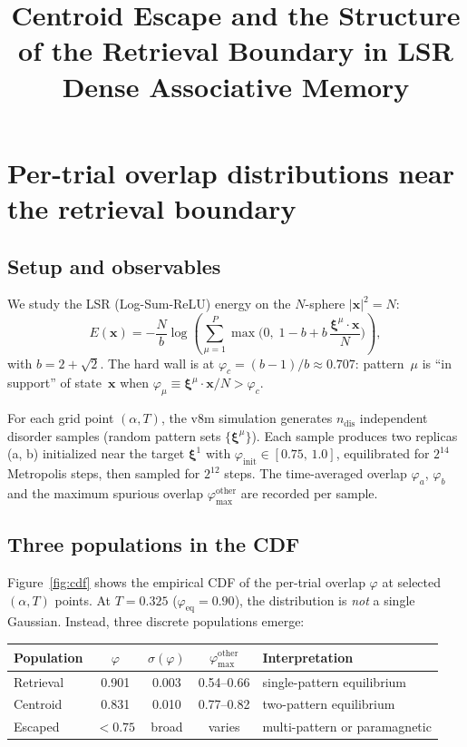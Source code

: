 \documentclass[11pt]{article}
\title{Centroid Escape and the Structure of the Retrieval Boundary in LSR Dense Associative Memory}
\author{}
\date{}
\newcommand{\bxi}{\boldsymbol{\xi}}
\newcommand{\bx}{\mathbf{x}}
\begin{document}
\maketitle

\section{Per-trial overlap distributions near the retrieval boundary}

\subsection{Setup and observables}

We study the LSR (Log-Sum-ReLU) energy on the $N$-sphere $|\bx|^2 = N$:
\begin{equation}
E(\bx) = -\frac{N}{b}\log\left(\sum_{\mu=1}^{P}\max\!\Big(0,\;1 - b + b\,\frac{\bxi^\mu \cdot \bx}{N}\Big)\right),
\label{eq:lsr}
\end{equation}
with $b = 2+\sqrt{2}$.  The hard wall is at $\varphi_c = (b-1)/b \approx 0.707$: pattern~$\mu$ is ``in support'' of state~$\bx$ when $\varphi_\mu \equiv \bxi^\mu\!\cdot\!\bx/N > \varphi_c$.

For each grid point $(\alpha, T)$, the v8m simulation generates $n_{\mathrm{dis}}$ independent disorder samples (random pattern sets $\{\bxi^\mu\}$).  Each sample produces two replicas (a, b) initialized near the target $\bxi^1$ with $\varphi_{\mathrm{init}}\in[0.75,\,1.0]$, equilibrated for $2^{14}$ Metropolis steps, then sampled for $2^{12}$ steps.  The time-averaged overlap $\varphi_a$, $\varphi_b$ and the maximum spurious overlap $\varphi_{\max}^{\mathrm{other}}$ are recorded per sample.

\subsection{Three populations in the CDF}

Figure~\ref{fig:cdf} shows the empirical CDF of the per-trial overlap $\varphi$ at selected $(\alpha, T)$ points.  At $T = 0.325$ ($\varphi_{\mathrm{eq}} = 0.90$), the distribution is \emph{not} a single Gaussian.  Instead, three discrete populations emerge:

\begin{center}
\begin{tabular}{lcccl}
\toprule
Population & $\varphi$ & $\sigma(\varphi)$ & $\varphi_{\max}^{\mathrm{other}}$ & Interpretation \\
\midrule
Retrieval & 0.901 & 0.003 & 0.54--0.66 & single-pattern equilibrium \\
Centroid  & 0.831 & 0.010 & 0.77--0.82 & two-pattern equilibrium \\
Escaped   & $< 0.75$ & broad & varies & multi-pattern or paramagnetic \\
\bottomrule
\end{tabular}
\end{center}
\end{document}
